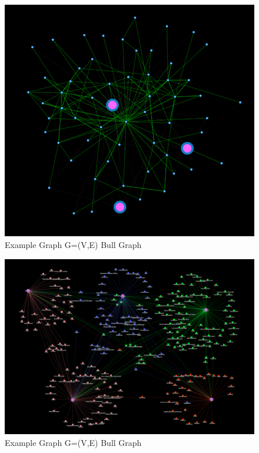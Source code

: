 \begin{figure}[H]
\centering
\includegraphics[scale=0.3]{t4.png}
\caption{Example Graph G=(V,E) Bull Graph}
\end{figure}

\begin{figure}[H]
\centering
\includegraphics[scale=0.3]{t5.png}
\caption{Example Graph G=(V,E) Bull Graph}
\end{figure}

